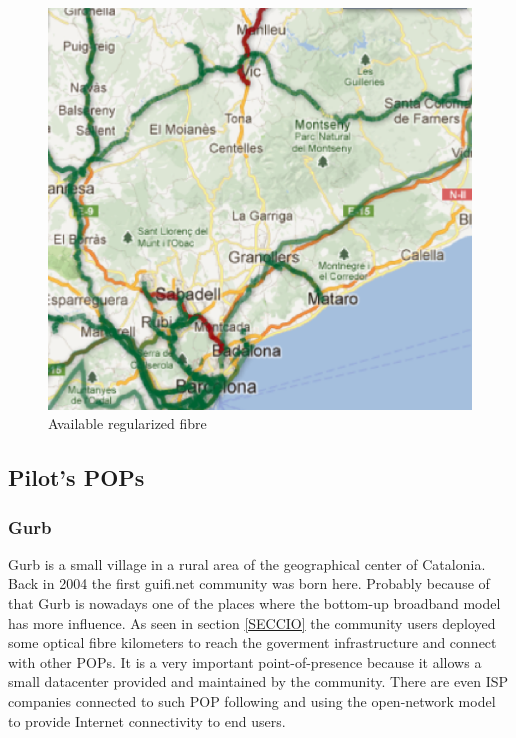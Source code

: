 \begin{figure}[htbp]
  \centering
  \includegraphics[scale=.5]{sect3/figures/xoc_map.eps} 
  \caption{Available regularized fibre}
  \label{fig:xoc_map}
\end{figure}



\subsection{Pilot's POPs}

\subsubsection{Gurb}

Gurb is a small village in a rural area of the geographical center of Catalonia. Back in 2004 the first guifi.net community
was born here. Probably because of that Gurb is nowadays one of the places where the bottom-up broadband model has more
influence. As seen in section \ref{SECCIO} the community users deployed some optical fibre kilometers to reach the goverment
infrastructure and connect with other POPs.
\medskip
It is a very important point-of-presence because it allows a small datacenter provided and maintained by the community.
There are even ISP companies connected to such POP following and using the open-network model to provide Internet
connectivity to end users.


